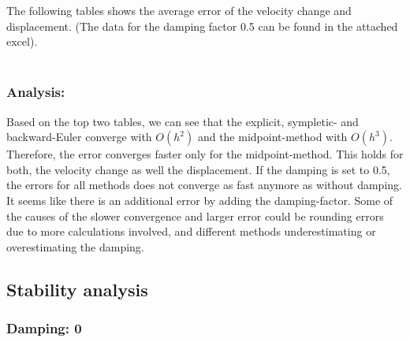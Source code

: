 \documentclass{article}
\begin{document}
The following tables shows the average error of the velocity change and displacement. (The data for the damping factor 0.5 can be found in the attached excel).
\\
\\

\subsubsection{Analysis:}
Based on the top two tables, we can see that the explicit, sympletic- and backward-Euler converge with $O(h^2)$ and the midpoint-method with $O(h^3)$. Therefore, the error converges faster only for the midpoint-method. This holds for both, the velocity change as well the displacement.
If the damping is set to 0.5, the errors for all methods does not converge as fast anymore as without damping. It seems like there is an additional error by adding the damping-factor. Some of the causes of the slower convergence and larger error could be rounding errors due to more calculations involved, and different methods underestimating or overestimating the damping.


\subsection{Stability analysis}
\subsubsection{Damping: 0}
\end{document}
